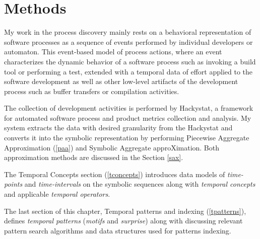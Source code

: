 \chapter{Methods} \label{methods}
My work in the process discovery mainly rests on a behavioral representation of software processes as a sequence of events performed by individual developers or automaton. This event-based model of process actions, where an event characterizes the dynamic behavior of a software process such as invoking a build tool or performing a test, extended with a temporal data of effort applied to the software development as well as other low-level artifacts of the development process such as buffer transfers or compilation activities. 

The collection of development activities is performed by Hackystat, a framework for automated software process and product metrics collection and analysis. My system extracts the data with desired granularity from the Hackystat and converts it into the symbolic representation by performing Piecewise Aggregate Approximation (\ref{paa}) and Symbolic Aggregate approXimation.  Both approximation methods are discussed in the Section \ref{sax}.

The Temporal Concepts section (\ref{tconcepts}) introduces data models of \textit{time-points} and \textit{time-intervals} on the symbolic sequences along with \textit{temporal concepts} and applicable \textit{temporal operators}. 

The last section of this chapter, Temporal patterns  and indexing (\ref{tpatterns}), defines \textit{temporal patterns} (\textit{motifs} and \textit{surprise}) along with discussing relevant pattern search algorithms and data structures used for patterns indexing.